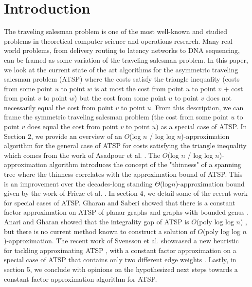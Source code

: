 \documentclass[oneside]{projectpaper} %
\begin{document}
\section{Introduction}
The traveling salesman problem is one of the most well-known and studied problems in theoretical computer science and operations research. Many real world problems, from delivery routing to latency networks to DNA sequencing, can be framed as some variation of the traveling salesman problem. In this paper, we look at the current state of the art algorithms for the asymmetric traveling salesman problem (ATSP) where the costs satisfy the triangle inequality (costs from some point $u$ to point $w$ is at most the cost from point $u$ to point $v$ + cost from point $v$ to point $w$) but the cost from some point $u$ to point $v$ does not necessarily equal the cost from point $v$ to point $u$. From this description, we can frame the symmetric traveling salesman problem (the cost from some point $u$ to point $v$ does equal the cost from point $v$ to point $u$) as a special case of ATSP. \newline
\indent In Section 2, we provide an overview of an $O$(log $n$ / log log $n$)-approximation algorithm for the general case of ATSP for costs satisfying the triangle inequality which comes from the work of Asadpour et al. \cite{AGM10}. The $O$(log $n$ / log log $n$)-approximation algorithm introduces the concept of the "thinness" of a spanning tree where the thinness correlates with the approximation bound of ATSP. This is an improvement over the decades-long standing $\Theta$(log$n$)-approximation bound given by the work of Frieze et al. \cite{FGM83}. \newline
\indent In section 4, we detail some of the recent work for special cases of ATSP.  Gharan and Saberi showed that there is a constant factor approximation on ATSP of planar graphs and graphs with bounded genus \cite{GS11}. Anari and Gharan showed that the integrality gap of ATSP is $O$(poly log log $n$) \cite{AG15}, but there is no current method known to construct a solution of $O$(poly log log $n$)-approximation. The recent work of Svensson et al. showcased a new heuristic for tackling approximating ATSP \cite{Sve15}, with a constant factor approximation on a special case of ATSP that contains only two different edge weights \cite{STV16}. \newline
\indent Lastly, in section 5, we conclude with opinions on the hypothesized next steps towards a constant factor approximation algorithm for ATSP.
\end{document}
